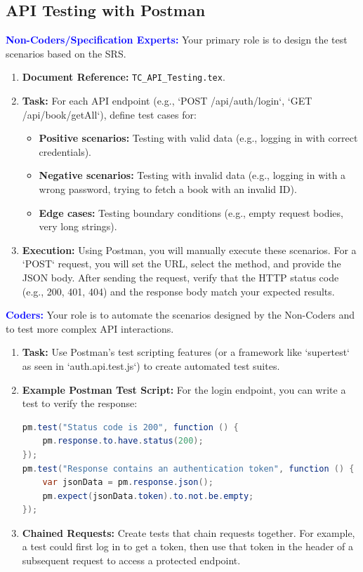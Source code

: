 \documentclass{article}
\newcommand{\role}[1]{\textbf{\textcolor{blue}{#1:}}}
\begin{document}
\subsection{API Testing with Postman}
\role{Non-Coders/Specification Experts}
Your primary role is to design the test scenarios based on the SRS.
\begin{enumerate}
    \item \textbf{Document Reference:} \texttt{TC\_API\_Testing.tex}.
    \item \textbf{Task:} For each API endpoint (e.g., `POST /api/auth/login`, `GET /api/book/getAll`), define test cases for:
    \begin{itemize}
        \item \textbf{Positive scenarios:} Testing with valid data (e.g., logging in with correct credentials).
        \item \textbf{Negative scenarios:} Testing with invalid data (e.g., logging in with a wrong password, trying to fetch a book with an invalid ID).
        \item \textbf{Edge cases:} Testing boundary conditions (e.g., empty request bodies, very long strings).
    \end{itemize}
    \item \textbf{Execution:} Using Postman, you will manually execute these scenarios. For a `POST` request, you will set the URL, select the method, and provide the JSON body. After sending the request, verify that the HTTP status code (e.g., 200, 401, 404) and the response body match your expected results.
\end{enumerate}

\role{Coders}
Your role is to automate the scenarios designed by the Non-Coders and to test more complex API interactions.
\begin{enumerate}
    \item \textbf{Task:} Use Postman's test scripting features (or a framework like `supertest` as seen in `auth.api.test.js`) to create automated test suites.
    \item \textbf{Example Postman Test Script:} For the login endpoint, you can write a test to verify the response:
    \begin{lstlisting}[language=Java]
pm.test("Status code is 200", function () {
    pm.response.to.have.status(200);
});
pm.test("Response contains an authentication token", function () {
    var jsonData = pm.response.json();
    pm.expect(jsonData.token).to.not.be.empty;
});
    \end{lstlisting}
    \item \textbf{Chained Requests:} Create tests that chain requests together. For example, a test could first log in to get a token, then use that token in the header of a subsequent request to access a protected endpoint.
\end{enumerate}
\end{document}

